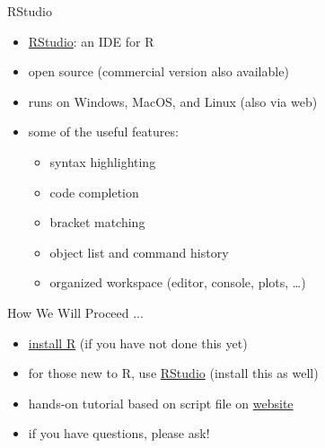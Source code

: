 \documentclass[t,12pt]{beamer}
\begin{document}

\begin{frame}{RStudio}

\begin{itemize}
   \item \href{https://www.rstudio.com/}{RStudio}: an IDE for R
   \item open source (commercial version also available)
   \item runs on Windows, MacOS, and Linux (also via web)
   \item some of the useful features:
   \begin{itemize}
      \item syntax highlighting
      \item code completion
      \item bracket matching
      \item object list and command history
      \item organized workspace (editor, console, plots, …)
   \end{itemize}
\end{itemize}

\end{frame}


\begin{frame}{How We Will Proceed ...}

\begin{itemize}
   \item \href{https://cran.r-project.org/}{install R} (if you have not done this yet)
   \item for those new to R, use \href{https://www.rstudio.com/}{RStudio} (install this as well)
   \item hands-on tutorial based on script file on \href{https://wviechtb.github.io/scrum-club/materials/materials.html}{website}
   \item if you have questions, please ask!
\end{itemize}

\end{frame}

\end{document}
